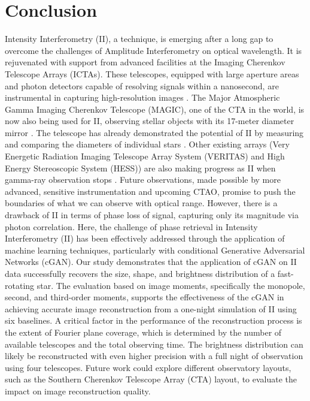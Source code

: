 \section{Conclusion}
Intensity Interferometry (II), a technique, is emerging after a long gap to overcome the challenges of Amplitude Interferometry on optical wavelength. It is rejuvenated with support from advanced facilities at the Imaging Cherenkov Telescope Arrays (ICTAs). These telescopes, equipped with large aperture areas and photon detectors capable of resolving signals within a nanosecond, are instrumental in capturing high-resolution images \citep{dravins2013optical}. The Major Atmospheric Gamma Imaging Cherenkov Telescope (MAGIC), one of the CTA in the world, is now also being used for II, observing stellar objects with its 17-meter diameter mirror \citep{lorenz2004status}. The telescope has already demonstrated the potential of II by measuring and comparing the diameters of individual stars \citep{abe2024performance}. Other existing arrays (Very Energetic Radiation Imaging Telescope Array System (VERITAS) and High Energy Stereoscopic System (HESS)) are also making progress as II when gamma-ray observation stops \citep{kieda2021veritas, zmija2022optical}. Future observations, made possible by more advanced, sensitive instrumentation and upcoming CTAO, promise to push the boundaries of what we can observe with optical range. However, there is a drawback of II in terms of phase loss of signal, capturing only its magnitude via photon correlation. Here, the challenge of phase retrieval in Intensity Interferometry (II) has been effectively addressed through the application of machine learning techniques, particularly with conditional Generative Adversarial Networks (cGAN). Our study demonstrates that the application of cGAN on II data successfully recovers the size, shape, and brightness distribution of a fast-rotating star. The evaluation based on image moments, specifically the monopole, second, and third-order moments, supports the effectiveness of the cGAN in achieving accurate image reconstruction from a one-night simulation of II using six baselines. A critical factor in the performance of the reconstruction process is the extent of Fourier plane coverage, which is determined by the number of available telescopes and the total observing time. The brightness distribution can likely be reconstructed with even higher precision with a full night of observation using four telescopes. Future work could explore different observatory layouts, such as the Southern Cherenkov Telescope Array (CTA) layout, to evaluate the impact on image reconstruction quality.

